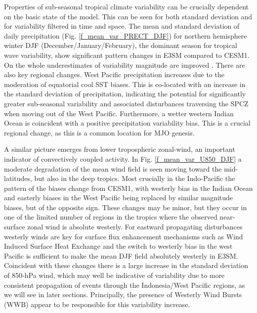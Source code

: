 \documentclass[draft,ms]{AGUTeX}
\begin{document}
\begin{article}
Properties of sub-seasonal tropical climate variability can be crucially dependent on the basic state of the model. This can be seen for both standard deviation and for variability filtered in time and space. The mean and standard deviation of daily precipitation (Fig. \ref{f_mean_var_PRECT_DJF}) for northern hemisphere winter DJF (December/January/February), the dominant season for tropical wave variability, show significant pattern changes in E3SM compared to CESM1. On the whole underestimates of variability magnitude are improved . There are also key regional changes. West Pacific precipitation increases due to the moderation of equatorial cool SST biases. This is co-located with an increase in the standard deviation of precipitation, indicating the potential for significantly greater sub-seasonal variability and associated disturbances traversing the SPCZ when moving out of the West Pacific. Furthermore, a wetter western Indian Ocean is coincident with a positive precipitation variability bias. This is a crucial regional change, as this is a common location for MJO genesis. 

A similar picture emerges from lower tropospheric zonal-wind, an important indicator of convectively coupled activity. In Fig. \ref{f_mean_var_U850_DJF} a moderate degradation of the mean wind field is seen moving toward the mid-latitudes, but also in the deep tropics. Most crucially in the Indo-Pacific the pattern of the biases change from CESM1, with westerly bias in the Indian Ocean and easterly biases in the West Pacific being replaced by similar magnitude biases, but of the opposite sign. These changes may be minor, but they occur in one of the limited number of regions in the tropics where the observed near-surface zonal wind is absolute westerly. For eastward propagating disturbances westerly winds are key for surface flux enhancement mechanisms such as Wind Induced Surface Heat Exchange \cite[WISHE,][]{Neelin1987,Emanuel1987} and the switch to westerly bias in the west Pacific is sufficient to make the mean DJF field absolutely westerly in E3SM. Coincident with these changes there is a large increase in the standard deviation of 850-hPa wind, which may well be indicative of variability due to more consistent propagation of events through the Indonesia/West Pacific regions, as we will see in later sections. Principally, the presence of Westerly Wind Bursts (WWB) appear to be responsible for this variability increase.


\end{article}
\end{document}
